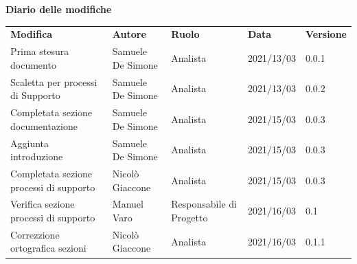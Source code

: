 \documentclass[a4paper]{article}
\begin{document}
\begin{center}

    \textbf{\Large Diario delle modifiche}\\
    \vspace{10px}
    \begin{table}[h!]
        \centering
        \renewcommand{\arraystretch}{1.8}
        \begin{tabular}{p{150px} p{90px} p{65px} p{60px} p{45px}}
            \rowcolor{logo!70} \textbf{Modifica}             & \textbf{Autore}   & \textbf{Ruolo}                    & \textbf{Data} & \textbf{Versione} \\
            Prima stesura documento                          & Samuele De Simone & Analista                          & 2021/13/03    & 0.0.1             \\
            Scaletta per processi di Supporto                & Samuele De Simone & Analista                          & 2021/13/03    & 0.0.2             \\
            Completata sezione \newline documentazione       & Samuele De Simone & Analista                          & 2021/15/03    & 0.0.3             \\
            Aggiunta introduzione                            & Samuele De Simone & Analista                          & 2021/15/03    & 0.0.3             \\
            Completata sezione processi \newline di supporto & Nicolò Giaccone   & Analista                          & 2021/15/03    & 0.0.3             \\
            Verifica sezione processi \newline di supporto   & Manuel Varo       & Responsabile \newline di Progetto & 2021/16/03    & 0.1               \\
            Correzzione ortografica sezioni                  & Nicolò Giaccone   & Analista                          & 2021/16/03    & 0.1.1             \\
        \end{tabular}
    \end{table}
\end{center}
\newpage
\tableofcontents
\newpage

%


\end{document}
